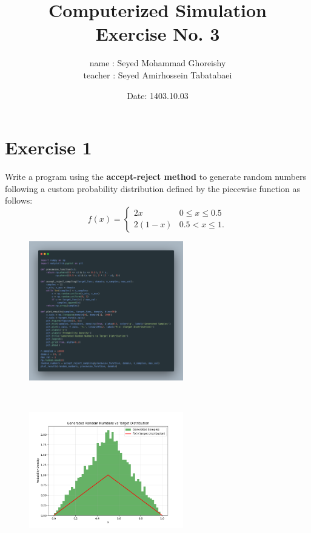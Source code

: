 \documentclass[a4paper,12pt]{article}
\title{Computerized Simulation \\
Exercise No. 3}
\author{name : Seyed Mohammad Ghoreishy \\ teacher : Seyed Amirhossein Tabatabaei }
\date{Date: 1403.10.03}
\begin{document}
\maketitle
\tableofcontents 
\newpage

\section{Exercise 1}
Write a program using the \textbf{accept-reject method} to generate random numbers following a custom probability distribution defined by the piecewise function as follows:
\begin{equation*}
    f(x) = \begin{cases} 
    2x & 0 \leq x \leq 0.5 \\
    2(1 - x) & 0.5 < x \leq 1.
    \end{cases}
\end{equation*}
\begin{figure}[h!]
    \centering
    \includegraphics[width=0.6\textwidth]{./Screenshots/1.py.png} 
\end{figure} \\
\begin{figure}[h!]
    \centering
    \includegraphics[width=0.6\textwidth]{./Screenshots/1.png} 
\end{figure} 
\newpage
\end{document}
